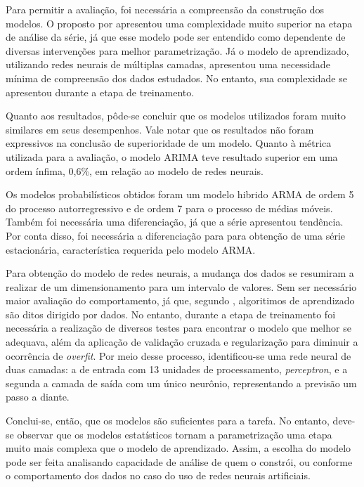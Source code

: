 \documentclass[
    12pt,
    oneside,
    a4paper,
    english,
    brazil
]{abntex2}
\begin{document}
Para  permitir a  avaliação,  foi  necessária a  compreensão  da construção  dos
modelos. O proposto por   apresentou uma complexidade
muito  superior na  etapa de  análise da  série, já  que esse  modelo pode  ser
entendido como dependente de  diversas intervenções para melhor parametrização.
Já o modelo  de  aprendizado,  utilizando redes  neurais  de  múltiplas  camadas,
apresentou  uma  necessidade mínima  de  compreensão  dos dados  estudados.  No
entanto, sua complexidade se apresentou durante a etapa de treinamento.

Quanto aos resultados,  pôde-se concluir que os modelos  utilizados foram muito
similares em seus desempenhos. Vale notar que os resultados  não foram expressivos
na conclusão de  superioridade de um modelo. Quanto à  métrica utilizada para a
avaliação, o modelo ARIMA teve resultado superior em uma ordem ínfima, 0,6\%, em
relação ao modelo de redes neurais.

Os modelos probabilísticos  obtidos foram  um modelo  hibrido ARMA  de ordem  5 do
processo autorregressivo e de ordem 7 para o processo de médias móveis. Também foi
necessária uma diferenciação,  já que a série apresentou tendência. Por conta
disso,  foi  necessária  a  diferenciação  para  para  obtenção  de  uma  série
estacionária, característica requerida pelo modelo ARMA\@.

Para obtenção  do modelo de  redes neurais, a mudança  dos dados se  resumiram a
realizar de um  dimensionamento para  um intervalo  de valores.  Sem ser
necessário maior avaliação do comportamento, já que, segundo ,
algoritimos de aprendizado  são ditos dirigido por dados. No  entanto, durante a
etapa  de treinamento  foi  necessária  a realização  de  diversos testes  para
encontrar  o modelo  que melhor  se adequava, além da  aplicação de  validação
cruzada e  regularização para  diminuir a  ocorrência de  \textit{overfit}. Por
meio desse processo, identificou-se uma rede  neural de duas camadas: a de
entrada com 13 unidades de  processamento, \textit{perceptron}, e a segunda a 
camada de saída com um único neurônio, representando a previsão um passo a diante.

Conclui-se, então, que os  modelos são suficientes para a tarefa. No entanto, deve-se
observar que os modelos estatísticos tornam  a parametrização uma etapa muito mais
complexa  que o  modelo de  aprendizado.  Assim, a  escolha do  modelo pode  ser
feita  analisando capacidade  de  análise de  quem o  constrói,  ou conforme  o
comportamento dos  dados no  caso do  uso de  redes neurais  artificiais.
\end{document}
